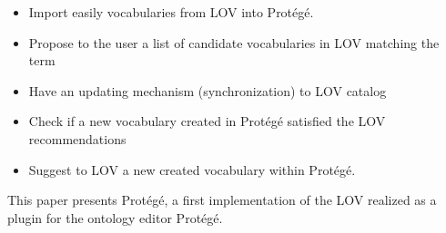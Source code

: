 \begin{itemize}
\item Import easily vocabularies from LOV into Prot{\'e}g{\'e}. 
\item Propose to the user a list of candidate vocabularies in LOV matching the term
\item Have an updating mechanism (synchronization) to LOV catalog
\item Check if a new vocabulary created in Prot{\'e}g{\'e} satisfied the LOV recommendations

\item Suggest to LOV a new created vocabulary within Prot{\'e}g{\'e}.
\end{itemize}

This paper presents Prot{\'e}g{\'e}, a first implementation of the LOV realized as a plugin for the ontology editor Prot{\'e}g{\'e}. 
 
